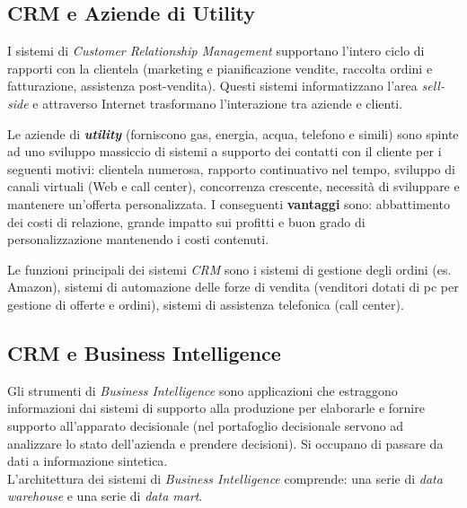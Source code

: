 \documentclass[a4paper, notitlepage, 9pt]{extreport}
\begin{document}
\subsection*{CRM e Aziende di Utility}
I sistemi di \textit{Customer Relationship Management} supportano l’intero ciclo di rapporti con la clientela (marketing e pianificazione vendite, raccolta ordini e fatturazione, assistenza post-vendita). Questi sistemi informatizzano l'area \textit{sell-side} e attraverso Internet trasformano l'interazione tra aziende e clienti.

\noindent
Le aziende di \textbf{\textit{utility}} (forniscono gas, energia, acqua, telefono e simili) sono spinte ad uno sviluppo massiccio di sistemi a supporto dei contatti con il cliente per i seguenti motivi: clientela numerosa, rapporto continuativo nel tempo, sviluppo di canali virtuali (Web e call center), concorrenza crescente, necessità di sviluppare e mantenere un'offerta personalizzata. I conseguenti \textbf{vantaggi} sono: abbattimento dei costi di relazione, grande impatto sui profitti e buon grado di personalizzazione mantenendo i costi contenuti.

\noindent
Le funzioni principali dei sistemi \textit{CRM} sono i sistemi di gestione degli ordini (es. Amazon), sistemi di automazione delle forze di vendita (venditori dotati di pc per gestione di offerte e ordini), sistemi di assistenza telefonica (call center).

\subsection*{CRM e Business Intelligence}
Gli strumenti di \textit{Business Intelligence} sono applicazioni che estraggono informazioni dai sistemi di supporto alla produzione per elaborarle e fornire supporto all’apparato decisionale (nel portafoglio decisionale servono ad analizzare lo stato dell'azienda e prendere decisioni). Si occupano di passare da dati a informazione sintetica.\\
L’architettura dei sistemi di \textit{Business Intelligence} comprende: una serie di \textit{data warehouse} e una serie di \textit{data mart}.
\end{document}
